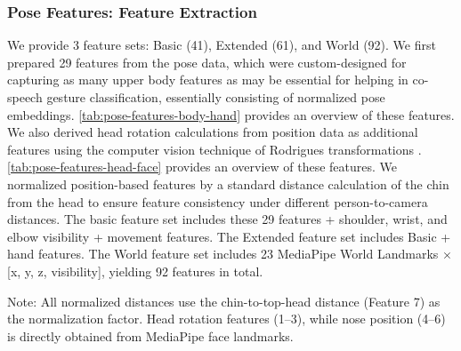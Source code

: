 \documentclass[11pt,smallheadings,cleardoublepage=empty,tocflat,numbers=noenddot,twoside,captions=tableheading]{scrbook}
\begin{document}
\begin{refsection}
\subsubsection{Pose Features: Feature Extraction}
We provide 3 feature sets: Basic (41), Extended (61), and World (92). We first prepared 29 features from the pose data, which were custom-designed for capturing as many upper body features as may be essential for helping in co-speech gesture classification, essentially consisting of normalized pose embeddings. \autoref{tab:pose-features-body-hand} provides an overview of these features. We also derived head rotation calculations from position data as additional features using the computer vision technique of Rodrigues transformations \parencite{pouwWimPouwsEnvisionBOX2024, thierfelderHeadPoseEstimation2023}. \autoref{tab:pose-features-head-face} provides an overview of these features. We normalized position-based features by a standard distance calculation of the chin from the head to ensure feature consistency under different person-to-camera distances. The basic feature set includes these 29 features + shoulder, wrist, and elbow visibility + movement features. The Extended feature set includes Basic + hand features. The World feature set includes 23 MediaPipe World Landmarks $\times$ [x, y, z, visibility], yielding 92 features in total.

Note: All normalized distances use the chin-to-top-head distance (Feature 7) as the normalization factor. Head rotation features (1--3), while nose position (4--6) is directly obtained from MediaPipe face landmarks. 


\end{refsection}
\end{document}

